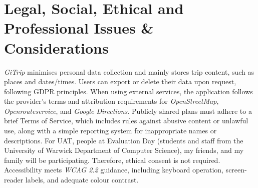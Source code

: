 \documentclass{article}
\begin{document}
\section{Legal, Social, Ethical and Professional Issues \& Considerations}

\textit{GiTrip} minimises personal data collection and mainly stores trip content, such as places and dates/times. Users can export or delete their data upon request, following GDPR principles. When using external services, the application follows the provider's terms and attribution requirements for \textit{OpenStreetMap}, \textit{Openrouteservice}, and \textit{Google Directions}. Publicly shared plans must adhere to a brief Terms of Service, which includes rules against abusive content or unlawful use, along with a simple reporting system for inappropriate names or descriptions. For UAT, people at Evaluation Day (students and staff from the University of Warwick Department of Computer Science), my friends, and my family will be participating. Therefore, ethical consent is not required. Accessibility meets \textit{WCAG 2.2} guidance, including keyboard operation, screen-reader labels, and adequate colour contrast.
\end{document}
